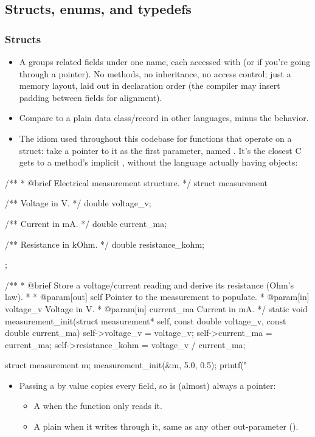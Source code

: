 \subsection{Structs, enums, and typedefs}
\label{c1:a:3}

\subsubsection{Structs}
\begin{itemize}
  \item A  groups related fields under one name, each accessed with  (or
    \code{->} if you're going through a pointer). No methods, no inheritance, no access control;
    just a memory layout, laid out in declaration order (the compiler may insert padding between
    fields for alignment).
  \item Compare to a plain data class/record in other languages, minus the behavior.
  \item The idiom used throughout this codebase for functions that operate on a struct: take a
    pointer to it as the first parameter, named . It's the closest C gets to a method's
    implicit , without the language actually having objects:
\end{itemize}

\begin{ccode}
/**
 * @brief Electrical measurement structure.
 */
struct measurement
{
    /** Voltage in V. */
    double voltage_v;

    /** Current in mA. */
    double current_ma;

    /** Resistance in kOhm. */
    double resistance_kohm;
};

/**
 * @brief Store a voltage/current reading and derive its resistance (Ohm's law).
 *
 * @param[out] self Pointer to the measurement to populate.
 * @param[in] voltage_v Voltage in V.
 * @param[in] current_ma Current in mA.
 */
static void measurement_init(struct measurement* self, const double voltage_v,
                              const double current_ma)
{
    self->voltage_v       = voltage_v;
    self->current_ma      = current_ma;
    self->resistance_kohm = voltage_v / current_ma;
}

struct measurement m;
measurement_init(&m, 5.0, 0.5);
printf("%
\end{ccode}

\begin{itemize}
  \item Passing a  by value copies every field, so  is (almost) always a
    pointer:
  \begin{itemize}
    \item A  when the function only reads it.
    \item A plain  when it writes through it, same as any other
      out-parameter ().
  \end{itemize}
\end{itemize}

